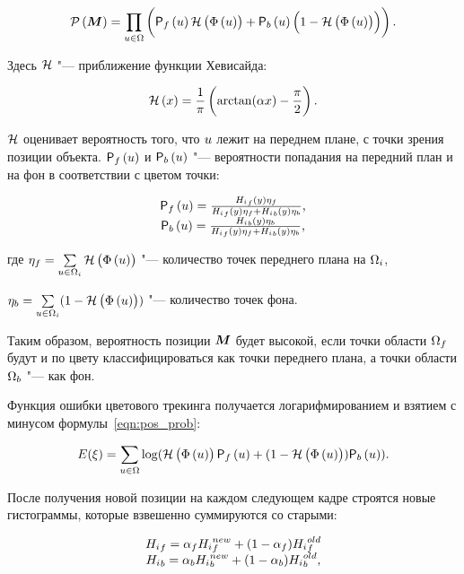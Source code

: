 \begin{equation}
\label{eqn:pos_prob}
    \mathcal{P} \left( \bm{M} \right)  = \prod\limits_{\mathnormal{u} \in \Omega} \left(
        \mathsf{P}_f \left( \mathnormal{u} \right) \mathcal{H} \left( \Phi \left( \mathnormal{u} \right) \right)
        + \mathsf{P}_b \left( \mathnormal{u} \right) \left( 1 - \mathcal{H} \left( \Phi \left( \mathnormal{u} \right) \right) \right)
    \right)
\text{.}
\end{equation}

Здесь $\mathcal{H}$ "--- приближение функции Хевисайда:

\begin{equation}
\label{eqn:heaviside}
    \mathcal{H} \left( x \right) = \frac{1}{\pi} \left( \arctan(\alpha x) - \frac{\pi}{2} \right)
\text{.}
\end{equation}

$\mathcal{H}$ оценивает вероятность того, что $\mathnormal{u}$ лежит на переднем плане, с точки
зрения позиции объекта.
$\mathsf{P}_f \left( \mathnormal{u} \right)$ и $\mathsf{P}_b \left( \mathnormal{u} \right)$ "--- вероятности попадания на передний план и
на фон в соответствии с цветом точки:

\begin{equation}
\label{eqn:Pfu}
\begin{array}{c}
\mathsf{P}_f \left( \mathnormal{u} \right) = \frac{{H_i}_f(y)\eta_f}{{H_i}_f(y)\eta_f +
{H_i}_b(y)\eta_b} \text{,} \\
\mathsf{P}_b \left( \mathnormal{u} \right) =\frac{{H_i}_b(y)\eta_b}{{H_i}_f(y)\eta_f +
{H_i}_b(y)\eta_b} \text{,}
\end{array}
\end{equation}

где
$
    \eta_f = \sum\limits_{\mathnormal{u} \in \Omega_i}\mathcal{H} \left( \Phi \left( \mathnormal{u} \right) \right)
$ "--- количество точек переднего плана на $\Omega_i$,

$
    \eta_b = \sum\limits_{\mathnormal{u} \in \Omega_i}(1 - \mathcal{H} \left( \Phi \left( \mathnormal{u} \right) \right))
$ "--- количество точек фона.


Таким образом, вероятность позиции $\bm{M}$ будет высокой, если точки области
$\Omega_f$ будут и по цвету классифицироваться как точки переднего плана, а
точки области $\Omega_b$ "--- как фон.

Функция ошибки цветового трекинга получается логарифмированием и взятием с
минусом
формулы~\ref{eqn:pos_prob}:

\begin{equation}
\label{eqn:err_func}
E(\xi) = \sum\limits_{\mathnormal{u} \in \Omega}
\log(\mathcal{H} \left( \Phi \left( \mathnormal{u} \right) \right) \mathsf{P}_f \left( \mathnormal{u} \right) + (1 - \mathcal{H} \left( \Phi \left( \mathnormal{u} \right) \right))\mathsf{P}_b \left( \mathnormal{u} \right))
\text{.}
\end{equation}

После получения новой позиции на каждом следующем кадре строятся новые
гистограммы, которые взвешенно суммируются со старыми: 

\begin{equation}
\begin{array}{c}
{\ensuremath{H_i}}_f = \alpha_f {H_i}_f^{new} + (1 - \alpha_f) {H_i}_f^{old} \\
{H_i}_b = \alpha_b {H_i}_b^{new} + (1 - \alpha_b) {H_i}_b^{old}
\text{,}
\end{array}
\end{equation}

